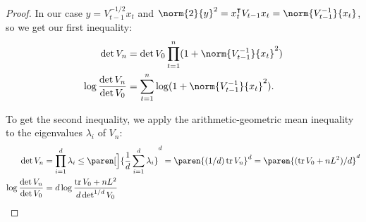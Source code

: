 \documentclass{article}
\newcommand{\inv}[1]{#1^{-1}}
\DeclareMathOperator{\tr}{tr}
\DeclarePairedDelimiter{\paren}()
\newcommand{\transp}[1]{#1^\intercal}
\begin{document}
\begin{lemma}
\begin{proof}
    In our case $y = V_{t-1}^{-1/2}x_t$ and $\norm{2}{y}^2 =
    \transp{x_t}V_{t-1}x_t = \norm{\inv{V_{t-1}}}{x_t}$, so we get our
    first inequality:
    \begin{align*}
      \det V_n &= \det V_0 \prod_{t=1}^n(1 + \norm{\inv{V_{t-1}}}{x_t}^2) \\
      \log\frac{\det V_n}{\det V_0} &= \sum_{t=1}^n\log(1+\norm{\inv{V_{t-1}}}{x_t}^2).
    \end{align*}

    To get the second inequality, we apply the arithmetic-geometric
    mean inequality to the eigenvalues $\lambda_i$ of $V_n$:
    \begin{align*}
      \det V_n &= \prod_{i=1}^d \lambda_i
                \le \paren[\Big]{\frac{1}{d} \sum_{i=1}^d \lambda_i}^d
                = \paren{(1/d)\tr V_n}^d
                = \paren{(\tr V_0 + nL^2)/d}^d \\
      \log\frac{\det V_n}{\det V_0}
              &= d\log\frac{\tr V_0 + nL^2}{d\det^{1/d}V_0}
    \end{align*}

  \end{proof}

\end{lemma}
\end{document}
